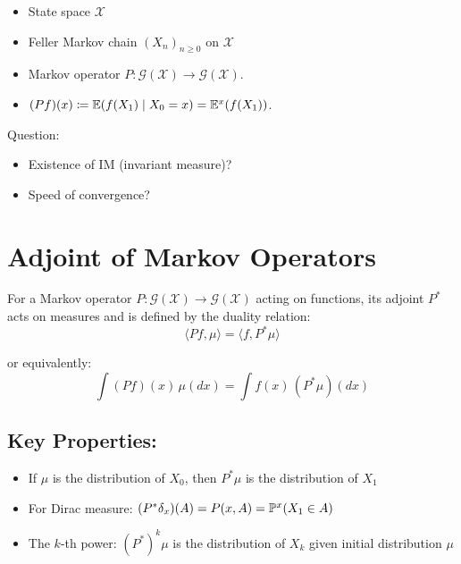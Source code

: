 \documentclass{amsart}
\let\originalmathbb\mathbb
\renewcommand{\mathbb}[1]{%
    \ifstrequal{#1}{1}{\mathbbm{#1}}{\originalmathbb{#1}}%
}
\theoremstyle{plain}
\theoremstyle{definition}
\theoremstyle{remark}
\begin{document}
\begin{itemize}
	\item State space $\mathcal{X}$
	\item Feller Markov chain $(X_n)_{n\geq0}$ on $\mathcal{X}$
	\item Markov operator $P:\mathcal{G}(\mathcal{X})\to \mathcal{G}(\mathcal{X})$.
	\item $(Pf)(x)\coloneqq \mathbb{E}(f(X_1)\mid X_0=x)=\mathbb{E}^{x}(f(X_1))$.
\end{itemize}

Question:

\begin{itemize}
	\item Existence of IM (invariant measure)?
	\item Speed of convergence?
\end{itemize}

\section{Adjoint of Markov Operators}

For a Markov operator $P: \mathcal{G}(\mathcal{X}) \to \mathcal{G}(\mathcal{X})$ acting on functions, its adjoint $P^*$ acts on measures and is defined by the duality relation:
\[
\langle Pf, \mu \rangle = \langle f, P^*\mu \rangle
\]

or equivalently:
\[
\int (Pf)(x) \, \mu(dx) = \int f(x) \, (P^*\mu)(dx)
\]

\subsection{Key Properties:}

\begin{itemize}
	\item If $\mu$ is the distribution of $X_0$, then $P^*\mu$ is the distribution of $X_1$
	\item For Dirac measure: $(P^*\delta_x)(A) = P(x,A) = \mathbb{P}^x(X_1 \in A)$
	\item The $k$-th power: $(P^*)^k\mu$ is the distribution of $X_k$ given initial distribution $\mu$
\end{itemize}
\end{document}
